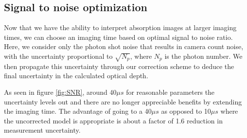 \documentclass[12pt]{iopart}
\begin{document}
\subsection{Signal to noise optimization}
Now that we have the ability to interpret absorption images at larger imaging times, we can choose an imaging time based on optimal signal to noise ratio. Here, we consider only the photon shot noise that results in camera count noise, with the uncertainty proportional to $\sqrt{N_p}$, where $N_p$ is the photon number. We then propagate this uncertainty through our correction scheme to deduce the final uncertainty in the calculated optical depth. 
\par As seen in figure \ref{fig:SNR}, around 40$\mu s$ for reasonable parameters the uncertainty levels out and there are no longer appreciable benefits by extending the imaging time. The advantage of going to a 40$\mu s$ as opposed to 10$\mu s$ where the uncorrected model is appropriate is about a factor of  1.6 reduction in measurement uncertainty. 
\end{document}
